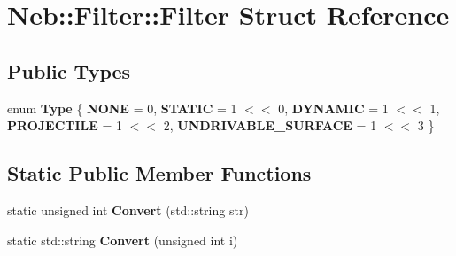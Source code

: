 \hypertarget{structNeb_1_1Filter_1_1Filter}{\section{\-Neb\-:\-:\-Filter\-:\-:\-Filter \-Struct \-Reference}
\label{structNeb_1_1Filter_1_1Filter}
}
\subsection*{\-Public \-Types}
\begin{DoxyCompactItemize}
\item 
enum {\bfseries \-Type} \{ \*
{\bfseries \-N\-O\-N\-E} =  0, 
{\bfseries \-S\-T\-A\-T\-I\-C} =  1 $<$$<$ 0, 
{\bfseries \-D\-Y\-N\-A\-M\-I\-C} =  1 $<$$<$ 1, 
{\bfseries \-P\-R\-O\-J\-E\-C\-T\-I\-L\-E} =  1 $<$$<$ 2, 
\*
{\bfseries \-U\-N\-D\-R\-I\-V\-A\-B\-L\-E\-\_\-\-S\-U\-R\-F\-A\-C\-E} =  1 $<$$<$ 3
 \}
\end{DoxyCompactItemize}
\subsection*{\-Static \-Public \-Member \-Functions}
\begin{DoxyCompactItemize}
\item 
\hypertarget{structNeb_1_1Filter_1_1Filter_a6175f815cd0bf934403cb6cbba1436d7}{static unsigned int {\bfseries \-Convert} (std\-::string str)}\label{structNeb_1_1Filter_1_1Filter_a6175f815cd0bf934403cb6cbba1436d7}

\item 
\hypertarget{structNeb_1_1Filter_1_1Filter_a50a74864ce9b5fb2c9c9daf8f8ed7e08}{static std\-::string {\bfseries \-Convert} (unsigned int i)}\label{structNeb_1_1Filter_1_1Filter_a50a74864ce9b5fb2c9c9daf8f8ed7e08}

\end{DoxyCompactItemize}

